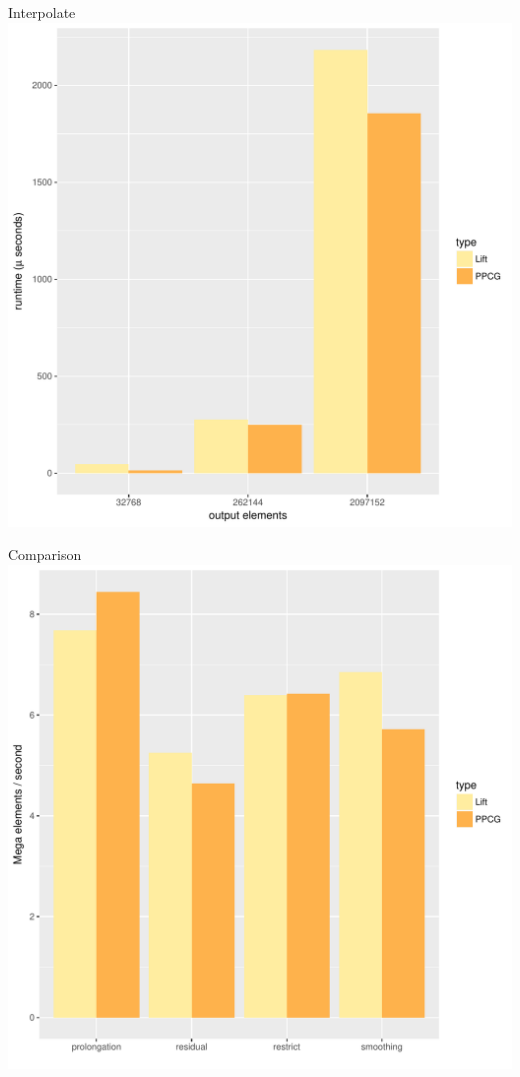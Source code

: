 \documentclass{beamer}
\begin{document}
\begin{frame}{Interpolate}
	\center
	\includegraphics[scale=0.35]{img/plots/interpolate.pdf}
\end{frame}

\begin{frame}{Comparison}
	\center
	\includegraphics[scale=0.35]{img/plots/global.pdf}
\end{frame}
\end{document}
